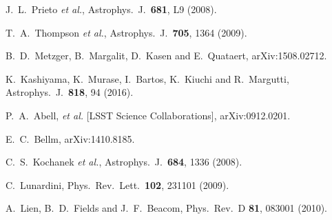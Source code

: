 \documentclass[aps,prd,nofootinbib,twocolumn,floatfix,letterpaper,superscriptaddress,showpacs]{revtex4}
\begin{document}
\begin{thebibliography}{99}
  J.~L.~Prieto {\it et al.},
  Astrophys.\ J.\  {\bf 681}, L9 (2008).

  T.~A.~Thompson {\it et al.},
  Astrophys.\ J.\  {\bf 705}, 1364 (2009).


  B.~D.~Metzger, B.~Margalit, D.~Kasen and E.~Quataert,
  arXiv:1508.02712.

  K.~Kashiyama, K.~Murase, I.~Bartos, K.~Kiuchi and R.~Margutti,
  Astrophys.\ J.\  {\bf 818}, 94 (2016).



  P.~A.\ Abell, {\it et al.} [LSST Science Collaborations],
  arXiv:0912.0201.

  E.~C.~Bellm,
  arXiv:1410.8185.


  C.~S.~Kochanek {\it et al.},
  Astrophys.\ J.\  {\bf 684}, 1336 (2008).

  C.~Lunardini,
  Phys.\ Rev.\ Lett.\  {\bf 102}, 231101 (2009).

  A.~Lien, B.~D.~Fields and J.~F.~Beacom,
  Phys.\ Rev.\ D {\bf 81}, 083001 (2010).


\end{thebibliography}
\end{document}
